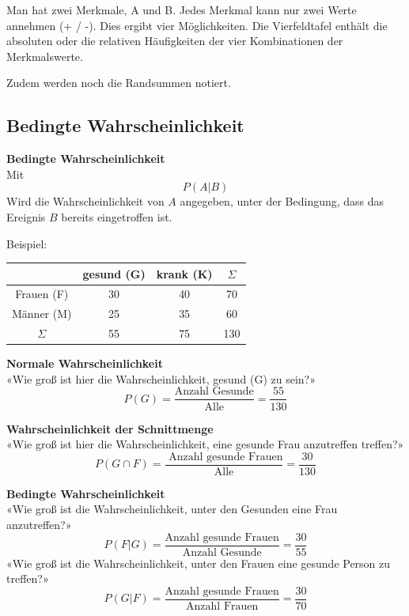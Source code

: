 \begin{multicols}{2}
Man hat zwei Merkmale, A und B. Jedes Merkmal kann nur zwei Werte
annehmen (+ / -). Dies ergibt vier Möglichkeiten. Die Vierfeldtafel
enthält die absoluten oder die relativen Häufigkeiten der vier
Kombinationen der Merkmalswerte.

Zudem werden noch die Randsummen notiert.



\subsection*{Bedingte Wahrscheinlichkeit}

\begin{tcolorbox}[colback=white]
  \textbf{Bedingte Wahrscheinlichkeit}\\
Mit
$$P(A|B)$$
Wird die Wahrscheinlichkeit von $A$ angegeben, unter der Bedingung,
dass das Ereignis $B$ bereits eingetroffen ist.
\end{tcolorbox}

Beispiel:

\begin{tabular}{c|c|c|c}
           & gesund (G)& krank (K)& $\Sigma$ \\\hline
Frauen (F) &        30 &       40 &       70 \\\hline
Männer (M) &        25 &       35 &       60 \\\hline
$\Sigma$   &        55 &       75 &      130 \\\hline
 \end{tabular}

\textbf{Normale Wahrscheinlichkeit}\\
«Wie groß ist hier die Wahrscheinlichkeit, gesund (G) zu sein?»
$$P(G) = \frac{\textrm{Anzahl Gesunde}}{\textrm{Alle}} =  \frac{55}{130}$$

\textbf{Wahrscheinlichkeit der Schnittmenge}\\
«Wie groß ist hier die Wahrscheinlichkeit, eine gesunde Frau anzutreffen treffen?»
$$P(G\cap F) = \frac{\textrm{\ Anzahl gesunde Frauen}}{\textrm{Alle}}= \frac{30}{130}$$

\textbf{Bedingte Wahrscheinlichkeit}\\
«Wie groß ist die Wahrscheinlichkeit, unter den Gesunden eine Frau anzutreffen?»
$$P(F | G) = \frac{\textrm{Anzahl gesunde Frauen}}{\textrm{Anzahl Gesunde}} =  \frac{30}{55}$$
«Wie groß ist die Wahrscheinlichkeit, unter den Frauen eine gesunde Person zu treffen?»
$$P(G | F) = \frac{\textrm{Anzahl gesunde Frauen}}{\textrm{Anzahl Frauen}}=  \frac{30}{70}$$


\end{multicols}


